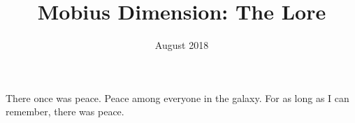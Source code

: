 \documentclass{article}
\title{Mobius Dimension: The Lore}
\author{}
\date{August 2018}
\begin{document}
\maketitle
\newpage

There once was peace. Peace among everyone in the galaxy. For as long as I can remember, there was peace. 
\end{document}
